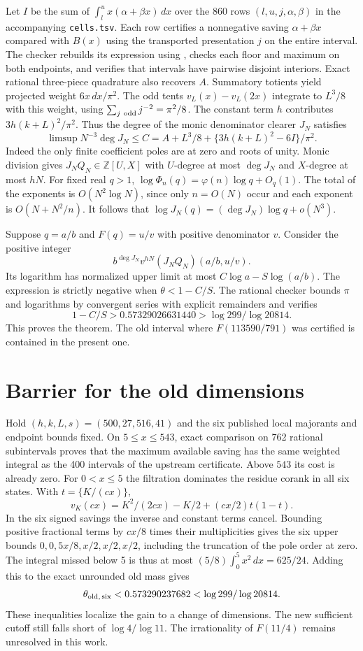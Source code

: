 \documentclass[11pt,a4paper]{article}
\begin{document}
Let $I$ be the sum of $\int_l^u x(\alpha+\beta x)\,dx$ over the
860 rows $(l,u,j,\alpha,\beta)$ in the accompanying \texttt{cells.tsv}.
Each row certifies a nonnegative saving $\alpha+\beta x$ compared with
$B(x)$ using the transported presentation $j$ on the entire interval.
The checker rebuilds its expression using \cite{p04-lam}, checks each floor
and maximum on both endpoints, and verifies that intervals have pairwise
disjoint interiors. Exact rational three-piece quadrature also recovers
$A$. Summatory totients yield projected weight $6x\,dx/\pi^2$.
The odd tents $v_L(x)-v_L(2x)$ integrate to $L^3/8$ with this
weight, using $\sum_{j\ {\rm odd}}j^{-2}=\pi^2/8$. The constant
term $h$ contributes $3h(k+L)^2/\pi^2$. Thus the degree of the
monic denominator clearer $J_N$ satisfies
\[
 \limsup N^{-3}\deg J_N\le
 C=A+L^3/8+\{3h(k+L)^2-6I\}/\pi^2.
\]
Indeed the only finite coefficient poles are at zero and roots of
unity. Monic division gives $J_NQ_N\in\mathbb Z[U,X]$ with
$U$-degree at most $\deg J_N$ and $X$-degree at most $hN$.
For fixed real $q>1$, $\log\Phi_n(q)=\varphi(n)\log q+O_q(1)$.
The total of the exponents is $O(N^2\log N)$, since only $n=O(N)$
occur and each exponent is $O(N+N^2/n)$. It follows that
$\log J_N(q)=(\deg J_N)\log q+o(N^3)$.
\par
Suppose $q=a/b$ and $F(q)=u/v$ with positive denominator $v$.
Consider the positive integer
\[ b^{\deg J_N}v^{hN}(J_NQ_N)(a/b,u/v). \]
Its logarithm has normalized upper limit at most
$C\log a-S\log(a/b)$. The expression is strictly negative when
$\theta<1-C/S$. The rational checker bounds $\pi$ and logarithms
by convergent series with explicit remainders and verifies
\[
 1-C/S>0.57329026631440>\log299/\log20814 .
\]
This proves the theorem. The old interval where $F(113590/791)$ was
certified is contained in the present one.

\section{Barrier for the old dimensions}
Hold $(h,k,L,s)=(500,27,516,41)$ and the six published local majorants
and endpoint bounds fixed. On $5\le x\le543$, exact comparison on 762
rational subintervals proves that the maximum available saving has the
same weighted integral as the 400 intervals of the upstream certificate.
Above $543$ its cost is already zero.
For $0<x\le5$ the filtration dominates the residue corank in all six
states. With $t=\{K/(cx)\}$,
\[
 v_K(cx)=K^2/(2cx)-K/2+(cx/2)t(1-t).
\]
In the six signed savings the inverse and constant terms cancel.
Bounding positive fractional terms by $cx/8$ times their multiplicities
gives the six upper bounds $0,0,5x/8,x/2,x/2,x/2$, including the
truncation of the pole order at zero. The integral missed below 5
is thus at most $(5/8)\int_0^5 x^2\,dx=625/24$. Adding this to the
exact unrounded old mass gives
\[
 \theta_{\rm old,\,six}<0.573290237682<\log299/\log20814.
\]
These inequalities localize the gain to a change of dimensions.
The new sufficient cutoff still falls short of $\log4/\log11$.
The irrationality of $F(11/4)$ remains unresolved in this work.
\end{document}
